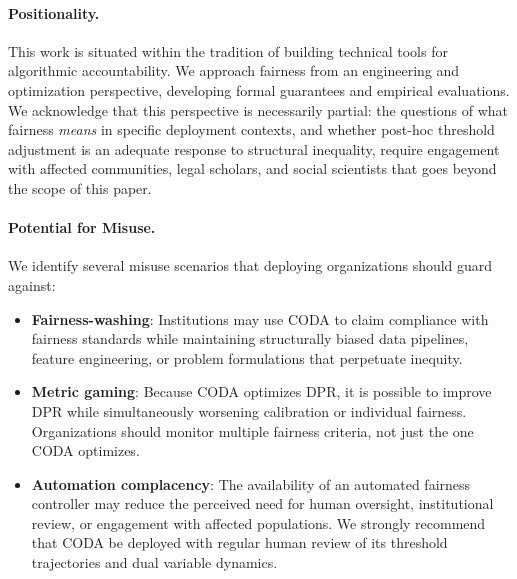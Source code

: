 \documentclass[letterpaper]{article} %
\theoremstyle{definition}
\begin{document}
\paragraph{Positionality.}
This work is situated within the tradition of building technical tools for algorithmic accountability. We approach fairness from an engineering and optimization perspective, developing formal guarantees and empirical evaluations. We acknowledge that this perspective is necessarily partial: the questions of what fairness \emph{means} in specific deployment contexts, and whether post-hoc threshold adjustment is an adequate response to structural inequality, require engagement with affected communities, legal scholars, and social scientists that goes beyond the scope of this paper.

\paragraph{Potential for Misuse.}
We identify several misuse scenarios that deploying organizations should guard against:
\begin{itemize}
    \item \textbf{Fairness-washing}: Institutions may use CODA to claim compliance with fairness standards while maintaining structurally biased data pipelines, feature engineering, or problem formulations that perpetuate inequity.
    \item \textbf{Metric gaming}: Because CODA optimizes DPR, it is possible to improve DPR while simultaneously worsening calibration or individual fairness. Organizations should monitor multiple fairness criteria, not just the one CODA optimizes.
    \item \textbf{Automation complacency}: The availability of an automated fairness controller may reduce the perceived need for human oversight, institutional review, or engagement with affected populations. We strongly recommend that CODA be deployed with regular human review of its threshold trajectories and dual variable dynamics.
\end{itemize}


\end{document}
